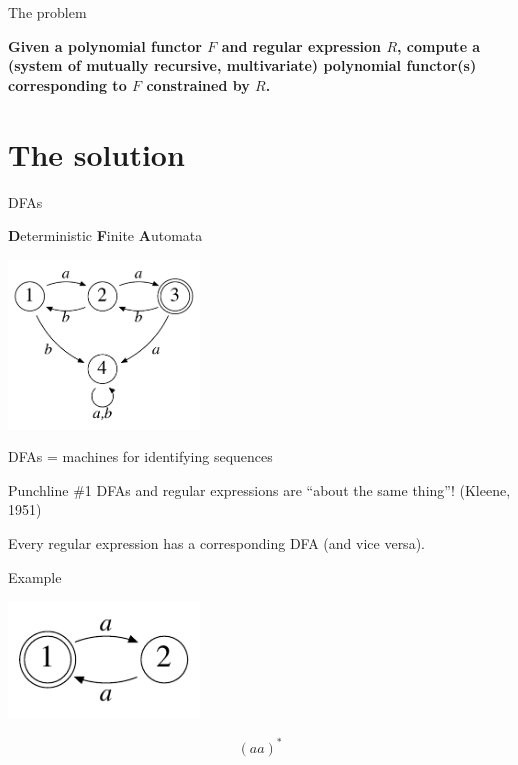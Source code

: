 \documentclass[xcolor=svgnames,12pt]{beamer}
\newenvironment{xframe}[1][]
  {\begin{frame}[fragile,environment=xframe,#1]}
  {\end{frame}}
\begin{document}
\begin{xframe}{The problem}
  \begin{center}
  \textbf{Given a polynomial functor $F$ and regular expression $R$, compute
  a (system of mutually recursive, multivariate) polynomial functor(s)
  corresponding to $F$ constrained by $R$.}
  \end{center}
\end{xframe}

\section{The solution}

\begin{xframe}{DFAs}
  \begin{center}
    \textbf{D}eterministic \textbf{F}inite \textbf{A}utomata \bigskip

    \includegraphics[width=2in]{example-DFA}

    DFAs = machines for identifying sequences
  \end{center}
\end{xframe}

\begin{xframe}{Punchline \#1}
  DFAs and regular expressions are ``about the same thing''! (Kleene,
  1951) \bigskip

  Every regular expression has a corresponding DFA (and vice versa).
\end{xframe}

\begin{xframe}{Example}
  \begin{center}
    \includegraphics[width=2in]{even-DFA}

    \[ (aa)^* \]
  \end{center}
\end{xframe}
\end{document}
